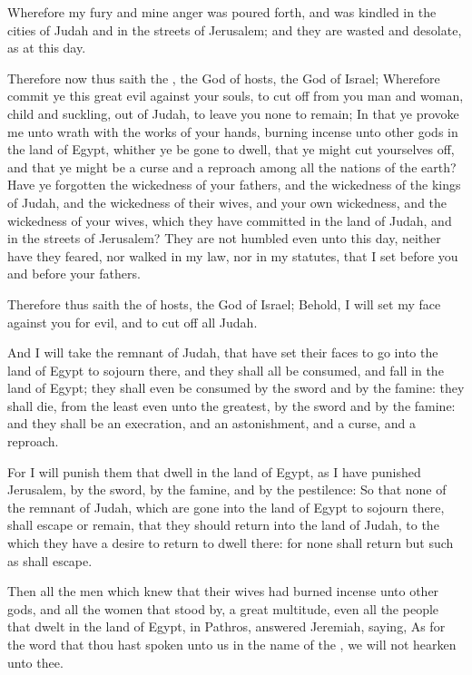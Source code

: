 \verse Wherefore my fury and mine anger was poured forth, and was kindled in the cities of Judah and in the streets of Jerusalem; and they are wasted and desolate, as at this day.

\verse Therefore now thus saith the \LORD, the God of hosts, the God of Israel; Wherefore commit ye this great evil against your souls, to cut off from you man and woman, child and suckling, out of Judah, to leave you none to remain; \verse In that ye provoke me unto wrath with the works of your hands, burning incense unto other gods in the land of Egypt, whither ye be gone to dwell, that ye might cut yourselves off, and that ye might be a curse and a reproach among all the nations of the earth?  \verse Have ye forgotten the wickedness of your fathers, and the wickedness of the kings of Judah, and the wickedness of their wives, and your own wickedness, and the wickedness of your wives, which they have committed in the land of Judah, and in the streets of Jerusalem?  \verse They are not humbled even unto this day, neither have they feared, nor walked in my law, nor in my statutes, that I set before you and before your fathers.

\verse Therefore thus saith the \LORD of hosts, the God of Israel; Behold, I will set my face against you for evil, and to cut off all Judah.

\verse And I will take the remnant of Judah, that have set their faces to go into the land of Egypt to sojourn there, and they shall all be consumed, and fall in the land of Egypt; they shall even be consumed by the sword and by the famine: they shall die, from the least even unto the greatest, by the sword and by the famine: and they shall be an execration, and an astonishment, and a curse, and a reproach.

\verse For I will punish them that dwell in the land of Egypt, as I have punished Jerusalem, by the sword, by the famine, and by the pestilence: \verse So that none of the remnant of Judah, which are gone into the land of Egypt to sojourn there, shall escape or remain, that they should return into the land of Judah, to the which they have a desire to return to dwell there: for none shall return but such as shall escape.

\verse Then all the men which knew that their wives had burned incense unto other gods, and all the women that stood by, a great multitude, even all the people that dwelt in the land of Egypt, in Pathros, answered Jeremiah, saying, \verse As for the word that thou hast spoken unto us in the name of the \LORD, we will not hearken unto thee.

